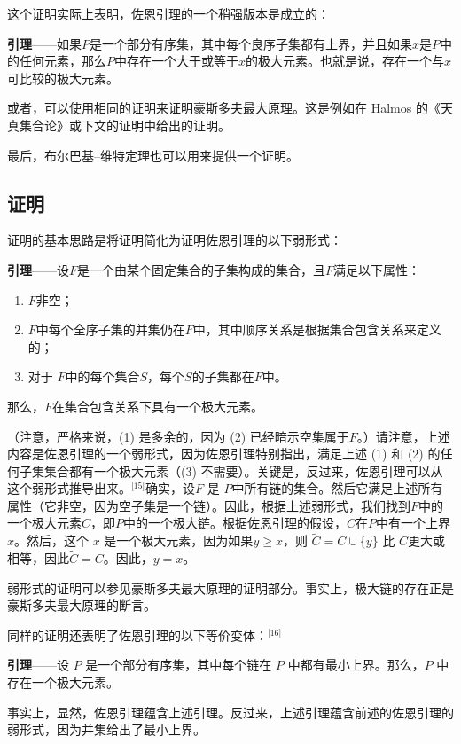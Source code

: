 这个证明实际上表明，佐恩引理的一个稍强版本是成立的：

\textbf{引理}——如果\( P \)是一个部分有序集，其中每个良序子集都有上界，并且如果\( x \)是\( P \)中的任何元素，那么\( P \)中存在一个大于或等于\( x \)的极大元素。也就是说，存在一个与\( x \)可比较的极大元素。

或者，可以使用相同的证明来证明豪斯多夫最大原理。这是例如在 Halmos 的《天真集合论》或下文的证明中给出的证明。

最后，布尔巴基–维特定理也可以用来提供一个证明。
\subsection{证明}  
证明的基本思路是将证明简化为证明佐恩引理的以下弱形式：

\textbf{引理}——设\( F \)是一个由某个固定集合的子集构成的集合，且\( F \)满足以下属性：
\begin{enumerate}
\item \( F \)非空；
\item \( F \)中每个全序子集的并集仍在\( F \)中，其中顺序关系是根据集合包含关系来定义的；
\item 对于 \( F \)中的每个集合\( S \)，每个\( S \)的子集都在\( F \)中。
\end{enumerate}
那么，\( F \)在集合包含关系下具有一个极大元素。

（注意，严格来说，(1) 是多余的，因为 (2) 已经暗示空集属于\( F \)。）请注意，上述内容是佐恩引理的一个弱形式，因为佐恩引理特别指出，满足上述 (1) 和 (2) 的任何子集集合都有一个极大元素（(3) 不需要）。关键是，反过来，佐恩引理可以从这个弱形式推导出来。\(^\text{[15]}\)确实，设\( F \) 是 \( P \)中所有链的集合。然后它满足上述所有属性（它非空，因为空子集是一个链）。因此，根据上述弱形式，我们找到\( F \)中的一个极大元素\( C \)，即\( P \)中的一个极大链。根据佐恩引理的假设，\( C \)在\( P \)中有一个上界\( x \)。然后，这个 \( x \) 是一个极大元素，因为如果\( y \geq x \)，则 \( \widetilde{C} = C \cup \{y\} \) 比 \( C \)更大或相等，因此\( \widetilde{C} = C \)。因此，\( y = x \)。

弱形式的证明可以参见豪斯多夫最大原理的证明部分。事实上，极大链的存在正是豪斯多夫最大原理的断言。

同样的证明还表明了佐恩引理的以下等价变体：\(^\text{[16]}\)

\textbf{引理}——设 \( P \) 是一个部分有序集，其中每个链在 \( P \) 中都有最小上界。那么，\( P \) 中存在一个极大元素。

事实上，显然，佐恩引理蕴含上述引理。反过来，上述引理蕴含前述的佐恩引理的弱形式，因为并集给出了最小上界。
